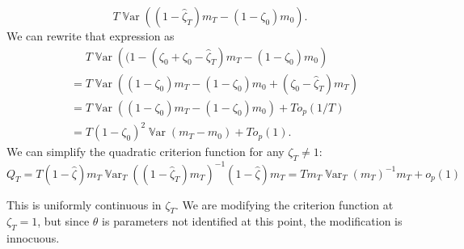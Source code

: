 \documentclass[11pt, letterpaper, twoside, final]{article}
\DeclareMathOperator*{\Var}{\mathbb{V}ar}
\begin{document}
\begin{equation}
    T \Var\left((1 - \widehat{\zeta}_T) m_T -  (1 - \zeta_0) m_0\right).
\end{equation}
%
We can rewrite that expression as 
%
\begin{align}
    &\phantom{=} T \Var\left((1 - (\zeta_0 + \zeta_0 - \widehat{\zeta}_T) m_T -  (1 - \zeta_0) m_0\right) \\
%
    &= T \Var\left((1 - \zeta_0)  m_T -  (1 - \zeta_0) m_0 + (\zeta_0 - \widehat{\zeta}_T) m_T \right) \\
    &= T \Var\left((1 - \zeta_0)  m_T -  (1 - \zeta_0) m_0\right)  + T o_p(1/T) \\
    &= T (1 - \zeta_0)^2 \Var\left( m_T -   m_0\right)  + T o_p(1). 
\end{align}
%
We can simplify the quadratic criterion function for any $\zeta_T \neq 1$: 
%
\begin{equation}
    Q_T =  T (1- \widehat{\zeta}) m_T \Var_T\left((1-\widehat{\zeta}_T) m_T\right)^{-1} (1- \widehat{\zeta}) m_T  
%
    = T m_T \Var_T(m_T)^{-1} m_T  + o_p(1)
\end{equation}

This is uniformly continuous in $\zeta_T$.
We are modifying the criterion function at $\zeta_T = 1$, but since $\theta$ is parameters not identified at this
point, the modification is innocuous. 
\end{document}
